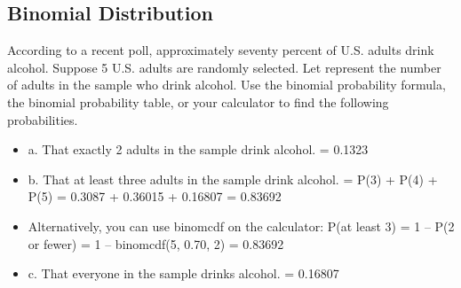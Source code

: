 \subsection{Binomial Distribution}
According to a recent poll, approximately seventy percent of U.S. adults drink alcohol.
Suppose 5 U.S. adults are randomly selected. Let represent the number of adults in the sample who drink 
alcohol. Use the binomial probability formula, the binomial probability table, or your calculator to find the 
following probabilities.
\begin{itemize}
\item a. That exactly 2 adults in the sample drink alcohol.
= 0.1323
\item b. That at least three adults in the sample drink alcohol.
= P(3) + P(4) + P(5) = 0.3087 + 0.36015 + 0.16807 = 0.83692
\item Alternatively, you can use binomcdf on the calculator:
P(at least 3) = 1 – P(2 or fewer) = 1 – binomcdf(5, 0.70, 2) = 0.83692
\item c. That everyone in the sample drinks alcohol.
= 0.16807
\end{itemize}


